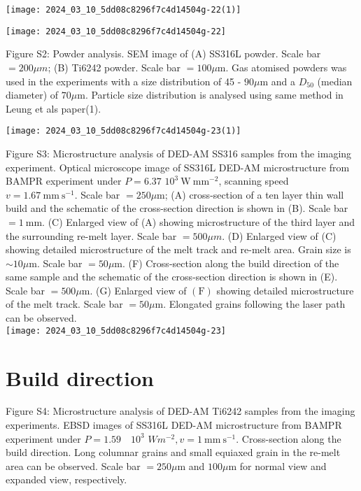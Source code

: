 \documentclass[10pt]{article}
\begin{document}
\begin{center}
\texttt{[image: 2024\_03\_10\_5dd08c8296f7c4d14504g-22(1)]}
\end{center}

\begin{center}
\texttt{[image: 2024\_03\_10\_5dd08c8296f7c4d14504g-22]}
\end{center}

Figure S2: Powder analysis. SEM image of (A) SS316L powder. Scale bar $=200 \mu m$; (B) Ti6242 powder. Scale bar $=100 \mu \mathrm{m}$. Gas atomised powders was used in the experiments with a size distribution of 45 - $90 \mu \mathrm{m}$ and a $D_{50}$ (median diameter) of $70 \mu \mathrm{m}$. Particle size distribution is analysed using same method in Leung et als paper(1).

\begin{center}
\texttt{[image: 2024\_03\_10\_5dd08c8296f7c4d14504g-23(1)]}
\end{center}

Figure S3: Microstructure analysis of DED-AM SS316 samples from the imaging experiment. Optical microscope image of SS316L DED-AM microstructure from BAMPR experiment under $P=6.37$ $10^{3} \mathrm{~W} \mathrm{~mm}^{-2}$, scanning speed $v=1.67 \mathrm{~mm} \mathrm{~s}^{-1}$. Scale bar $=250 \mu \mathrm{m}$; (A) cross-section of a ten layer thin wall build and the schematic of the cross-section direction is shown in (B). Scale bar $=1 \mathrm{~mm}$. (C) Enlarged view of (A) showing microstructure of the third layer and the surrounding re-melt layer. Scale bar $=500 \mu m$. (D) Enlarged view of (C) showing detailed microstructure of the melt track and re-melt area. Grain size is $\sim 10 \mu \mathrm{m}$. Scale bar $=50 \mu \mathrm{m}$. (F) Cross-section along the build direction of the same sample and the schematic of the cross-section direction is shown in (E). Scale bar $=500 \mu \mathrm{m}$. (G) Enlarged view of $(\mathrm{F})$ showing detailed microstructure of the melt track. Scale bar $=50 \mu \mathrm{m}$. Elongated grains following the laser path can be observed.\\
\texttt{[image: 2024\_03\_10\_5dd08c8296f7c4d14504g-23]}

\section*{Build direction}
Figure S4: Microstructure analysis of DED-AM Ti6242 samples from the imaging experiments. EBSD images of SS316L DED-AM microstructure from BAMPR experiment under $P=1.59 \quad 10^{3}$ $W m^{-2}, v=1 \mathrm{~mm} \mathrm{~s}^{-1}$. Cross-section along the build direction. Long columnar grains and small equiaxed grain in the re-melt area can be observed. Scale bar $=250 \mu \mathrm{m}$ and $100 \mu \mathrm{m}$ for normal view and expanded view, respectively.
\end{document}
